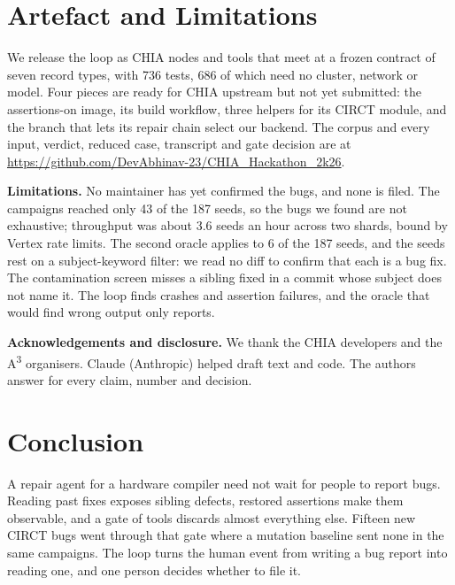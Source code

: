 \documentclass[conference]{IEEEtran}
\begin{document}
\section{Artefact and Limitations}
We release the loop as CHIA nodes and tools that meet at a frozen contract of
seven record types, with 736 tests, 686 of which need no cluster, network or
model. %
Four pieces are ready for CHIA upstream but not yet submitted: the
assertions-on image, its build workflow,
three helpers for its CIRCT module, and the branch that lets its repair chain
select our backend. %
The corpus and every input, verdict, reduced case, transcript and gate decision
are at \url{https://github.com/DevAbhinav-23/CHIA_Hackathon_2k26}.

\textbf{Limitations.} No maintainer has yet confirmed the bugs, and none is
filed. The campaigns reached only 43 of the 187 seeds, so the bugs we found are
not exhaustive; throughput was about 3.6 seeds an hour across two shards, bound
by Vertex rate limits. %
The second oracle applies to 6 of the 187 seeds, and the seeds rest on a
subject-keyword filter: we read no diff to confirm that each is a bug fix. %
The contamination screen misses a sibling fixed in a commit whose subject does
not name it. The loop finds crashes and assertion failures, and the oracle that
would find wrong output only reports.

\textbf{Acknowledgements and disclosure.} We thank the CHIA developers and the
A\textsuperscript{3} organisers. Claude (Anthropic) helped
draft text and code. The authors answer for every claim, number and decision.

\section{Conclusion}
A repair agent for a hardware compiler need not wait for people to report bugs.
Reading past fixes exposes sibling defects, restored assertions make them
observable, and a gate of tools discards almost everything else. Fifteen new
CIRCT bugs went through that gate where a mutation baseline sent none in the
same campaigns. The loop turns the human event from writing a bug report
into reading one, and one person decides whether to file it.



\end{document}
